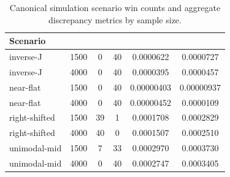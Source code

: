 \begin{table}[htbp]
  \centering
  \caption{Canonical simulation scenario win counts and aggregate discrepancy metrics by sample size.}
  \label{tab:app_sim_summary}
  \begin{tabular}{
    l
    S[table-format=4.0]
    S[table-format=2.0]
    S[table-format=2.0]
    S[table-format=1.7]
    S[table-format=1.7]
  }
    \toprule
    Scenario &
     &
     &
     &
     &
     \\
    \midrule
    inverse-J & 1500 & 0 & 40 & 0.0000622 & 0.0000727 \\
    inverse-J & 4000 & 0 & 40 & 0.0000395 & 0.0000457 \\
    near-flat & 1500 & 0 & 40 & 0.00000403 & 0.00000937 \\
    near-flat & 4000 & 0 & 40 & 0.00000452 & 0.0000109 \\
    right-shifted & 1500 & 39 & 1 & 0.0001708 & 0.0002829 \\
    right-shifted & 4000 & 40 & 0 & 0.0001507 & 0.0002510 \\
    unimodal-mid & 1500 & 7 & 33 & 0.0002970 & 0.0003730 \\
    unimodal-mid & 4000 & 0 & 40 & 0.0002747 & 0.0003405 \\
    \bottomrule
  \end{tabular}
\end{table}
